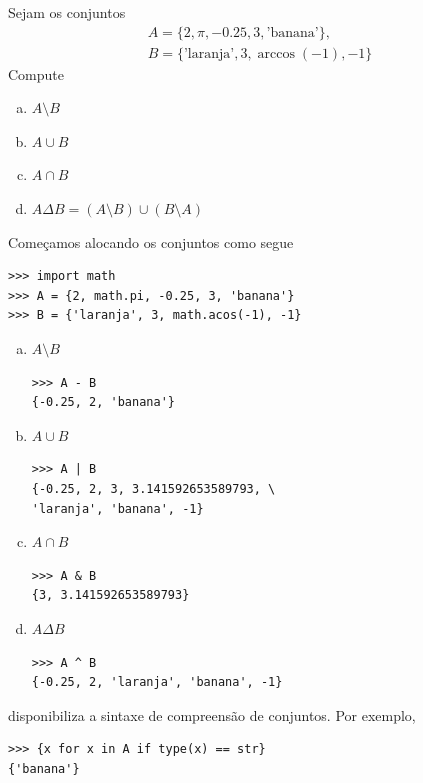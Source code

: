 \documentclass[12pt]{article}
\begin{document}
\begin{ex}
  Sejam os conjuntos
  \begin{gather}
    A = \{2, \pi, -0.25, 3, \text{'banana'}\},\\
    B = \{\text{'laranja'}, 3, \operatorname{arc cos}(-1), -1\}
  \end{gather}
  Compute
  \begin{enumerate}[a)]
  \item $A\setminus B$
  \item $A\cup B$
  \item $A\cap B$
  \item $A\Delta B = (A\setminus B) \cup (B\setminus A)$
  \end{enumerate}

   Começamos alocando os conjuntos como segue

\begin{lstlisting}
>>> import math
>>> A = {2, math.pi, -0.25, 3, 'banana'}
>>> B = {'laranja', 3, math.acos(-1), -1}
\end{lstlisting}
  
  \begin{enumerate}[a)]
  \item $A\setminus B$
  
\begin{lstlisting}
>>> A - B
{-0.25, 2, 'banana'}
\end{lstlisting}

  \item $A\cup B$
  
\begin{lstlisting}
>>> A | B
{-0.25, 2, 3, 3.141592653589793, \
'laranja', 'banana', -1}
\end{lstlisting}
  \item $A\cap B$

\begin{lstlisting}
>>> A & B
{3, 3.141592653589793}
\end{lstlisting}

  \item $A\Delta B$
  
\begin{lstlisting}
>>> A ^ B
{-0.25, 2, 'laranja', 'banana', -1}
\end{lstlisting}

\end{enumerate}
\end{ex}

\begin{obs}\label{obs:compreensão_de_conjuntos}
  {\python} disponibiliza a sintaxe de compreensão de conjuntos. Por exemplo,

\begin{lstlisting}
>>> {x for x in A if type(x) == str}
{'banana'}
\end{lstlisting}

\end{obs}
\end{document}
